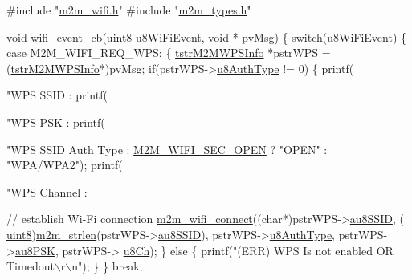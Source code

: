 \begin{DoxyCode}
\textcolor{preprocessor}{#include "\hyperlink{m2m__wifi_8h}{m2m\_wifi.h}"}
\textcolor{preprocessor}{#include "\hyperlink{m2m__types_8h}{m2m\_types.h}"}

\textcolor{keywordtype}{void} wifi\_event\_cb(\hyperlink{group__DataT_ga4df709a77647e870bbf1d955b8edc9a6}{uint8} u8WiFiEvent, \textcolor{keywordtype}{void} * pvMsg)
\{
    \textcolor{keywordflow}{switch}(u8WiFiEvent)
    \{
    \textcolor{keywordflow}{case} M2M\_WIFI\_REQ\_WPS:
        \{
            \hyperlink{structtstrM2MWPSInfo}{tstrM2MWPSInfo}  *pstrWPS = (\hyperlink{structtstrM2MWPSInfo}{tstrM2MWPSInfo}*)pvMsg;
            \textcolor{keywordflow}{if}(pstrWPS->\hyperlink{structtstrM2MWPSInfo_a6d61ebf61a47c7a83231fac0800c49c9}{u8AuthType} != 0)
            \{
                printf(\textcolor{stringliteral}{"WPS SSID           : %
                printf(\textcolor{stringliteral}{"WPS PSK            : %
                printf(\textcolor{stringliteral}{"WPS SSID Auth Type : %
      \hyperlink{group__WlanEnums_ggaa232a09c953ec8200c13774f94107b05a81b513753be791c13b73d0b2d3639b69}{M2M\_WIFI\_SEC\_OPEN} ? \textcolor{stringliteral}{"OPEN"} : \textcolor{stringliteral}{"WPA/WPA2"});
                printf(\textcolor{stringliteral}{"WPS Channel        : %
                
                \textcolor{comment}{// establish Wi-Fi connection}
                \hyperlink{group__WifiConnectFn_ga19c9871147efe70f5d9c2cc2cdd5bff0}{m2m\_wifi\_connect}((\textcolor{keywordtype}{char}*)pstrWPS->\hyperlink{structtstrM2MWPSInfo_a679b8247d9099096deffa1522dccbbde}{au8SSID}, (
      \hyperlink{group__DataT_ga4df709a77647e870bbf1d955b8edc9a6}{uint8})\hyperlink{nm__common_8h_a3c10c83b6b5eda6b18bbc40ca411eeb4}{m2m\_strlen}(pstrWPS->\hyperlink{structtstrM2MWPSInfo_a679b8247d9099096deffa1522dccbbde}{au8SSID}),
                    pstrWPS->\hyperlink{structtstrM2MWPSInfo_a6d61ebf61a47c7a83231fac0800c49c9}{u8AuthType}, pstrWPS->\hyperlink{structtstrM2MWPSInfo_a38d83b9735bd2ebc5304d1f6d3c6c879}{au8PSK}, pstrWPS->
      \hyperlink{structtstrM2MWPSInfo_a693e6204dbbe233cbf7aaa26e33d9f5c}{u8Ch});
            \}
            \textcolor{keywordflow}{else}
            \{
                printf(\textcolor{stringliteral}{"(ERR) WPS Is not enabled OR Timedout\(\backslash\)r\(\backslash\)n"});
            \}
        \}
        \textcolor{keywordflow}{break};
        
}}}}
\end{DoxyCode}
